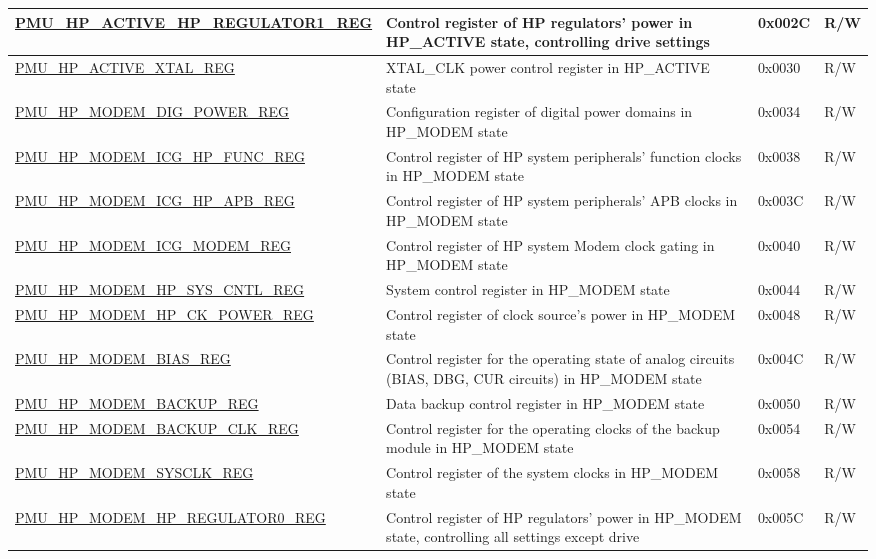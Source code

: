 \begin{longtable}{ | l | p{6cm} | p{1.3cm} | p{1.5cm} | }
\hyperref[regdesc:PMUHPACTIVEHPREGULATOR1REG]{PMU\_HP\_ACTIVE\_HP\_REGULATOR1\_REG} & Control register of HP regulators' power in HP\_ACTIVE state, controlling drive settings & 0x002C & R/W \\ \hline
\hyperref[regdesc:PMUHPACTIVEXTALREG]{PMU\_HP\_ACTIVE\_XTAL\_REG} & XTAL\_CLK power control register in HP\_ACTIVE state & 0x0030 & R/W \\ \hline
\hyperref[regdesc:PMUHPMODEMDIGPOWERREG]{PMU\_HP\_MODEM\_DIG\_POWER\_REG} & Configuration register of digital power domains in HP\_MODEM state & 0x0034 & R/W \\ \hline
\hyperref[regdesc:PMUHPMODEMICGHPFUNCREG]{PMU\_HP\_MODEM\_ICG\_HP\_FUNC\_REG} & Control register of HP system peripherals' function clocks in HP\_MODEM state & 0x0038 & R/W \\ \hline
\hyperref[regdesc:PMUHPMODEMICGHPAPBREG]{PMU\_HP\_MODEM\_ICG\_HP\_APB\_REG} & Control register of HP system peripherals' APB clocks in HP\_MODEM state & 0x003C & R/W \\ \hline
\hyperref[regdesc:PMUHPMODEMICGMODEMREG]{PMU\_HP\_MODEM\_ICG\_MODEM\_REG} & Control register of HP system Modem clock gating in HP\_MODEM state & 0x0040 & R/W \\ \hline
\hyperref[regdesc:PMUHPMODEMHPSYSCNTLREG]{PMU\_HP\_MODEM\_HP\_SYS\_CNTL\_REG} & System control register in HP\_MODEM state & 0x0044 & R/W \\ \hline
\hyperref[regdesc:PMUHPMODEMHPCKPOWERREG]{PMU\_HP\_MODEM\_HP\_CK\_POWER\_REG} & Control register of clock source's power in HP\_MODEM state & 0x0048 & R/W \\ \hline
\hyperref[regdesc:PMUHPMODEMBIASREG]{PMU\_HP\_MODEM\_BIAS\_REG} & Control register for the operating state of analog circuits (BIAS, DBG, CUR circuits) in HP\_MODEM state & 0x004C & R/W \\ \hline
\hyperref[regdesc:PMUHPMODEMBACKUPREG]{PMU\_HP\_MODEM\_BACKUP\_REG} & Data backup control register in HP\_MODEM state & 0x0050 & R/W \\ \hline
\hyperref[regdesc:PMUHPMODEMBACKUPCLKREG]{PMU\_HP\_MODEM\_BACKUP\_CLK\_REG} & Control register for the operating clocks of the backup module in HP\_MODEM state & 0x0054 & R/W \\ \hline
\hyperref[regdesc:PMUHPMODEMSYSCLKREG]{PMU\_HP\_MODEM\_SYSCLK\_REG} & Control register of the system clocks in HP\_MODEM state & 0x0058 & R/W \\ \hline
\hyperref[regdesc:PMUHPMODEMHPREGULATOR0REG]{PMU\_HP\_MODEM\_HP\_REGULATOR0\_REG} & Control register of HP regulators' power in HP\_MODEM state, controlling all settings except drive & 0x005C & R/W \\ \hline

\end{longtable}
